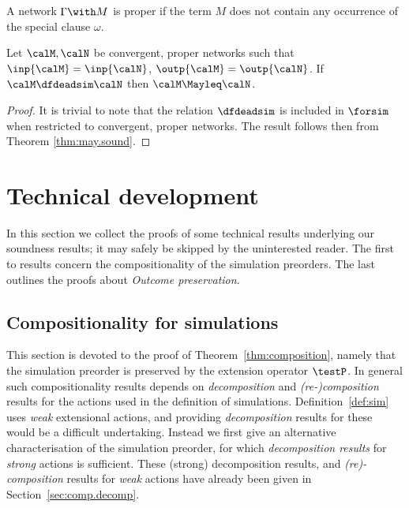 \documentclass{LMCS}
\begin{document}
\begin{thm}
\label{thm:may.dfsound}
A network $\Gamma \with M$ is proper if the term $M$ does not 
contain any occurrence of the special clause $\omega$. 

Let $\calM, \calN$ be convergent, proper networks such that 
$\inp{\calM} = \inp{\calN}$, $\outp{\calM} = \outp{\calN}$. 
If $\calM \dfdeadsim \calN$ 
then $\calM \Mayleq \calN$.
\end{thm}

\begin{proof}
It is trivial to note that the relation $\dfdeadsim$ is included in 
$\forsim$ when restricted to convergent, proper networks. 
The result follows then from Theorem \ref{thm:may.sound}.
\end{proof}

\section{Technical development}
\label{sec:technical}
In this section we collect the proofs of some technical results underlying our soundness
results; it may safely be skipped by the uninterested reader. 
The first to results concern the compositionality of the simulation preorders. The last 
outlines the proofs about \emph{Outcome preservation}. 
\subsection{Compositionality for  simulations}
\label{sec:technical.may.comp}

This section is devoted to the proof of Theorem~\ref{thm:composition}, namely
that the simulation preorder is preserved by  the extension operator $\testP$. 
In general such compositionality results depends on \emph{decomposition} and \emph{(re-)composition}
results for the actions used in the definition of simulations. Definition~\ref{def:sim} 
uses \emph{weak} extensional actions, and providing \emph{decomposition} results for 
these would be a  difficult undertaking. Instead we  first give an alternative 
characterisation of the simulation preorder, for which \emph{decomposition results} for
\emph{strong} actions is sufficient. These (strong) decomposition results, and 
\emph{(re)-composition} results for \emph{weak} actions have already been given in 
Section~\ref{sec:comp.decomp}. 
\end{document}
